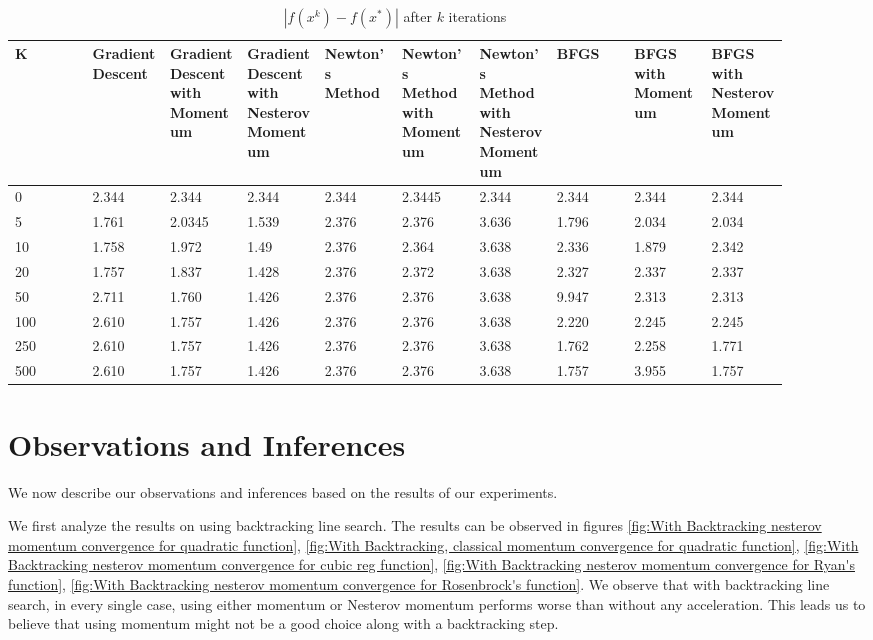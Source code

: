 \documentclass{article}
\begin{document}
\begin{table}[H]
	\centering
	\caption{$ | f(x^k) - f(x^*) | $ after $k$ iterations}
	\label{Levy's function table}
	\begin{tabular}{|l|p{0.1\linewidth}|p{0.1\linewidth}|p{0.1\linewidth}|p{0.1\linewidth}|p{0.1\linewidth}|p{0.1\linewidth}|p{0.1\linewidth}|p{0.1\linewidth}|p{0.1\linewidth}|}
		\hline
		K & Gradient Descent & Gradient Descent with Momentum & Gradient Descent with Nesterov Momentum & Newton's Method & Newton's Method with Momentum & Newton's Method with Nesterov Momentum & BFGS & BFGS with Momentum & BFGS with Nesterov Momentum \\
		\hline
		0 & 2.344 & 2.344 & 2.344 & 2.344 & 2.3445 & 2.344 & 2.344 & 2.344 & 2.344 \\
		\hline
		5 & 1.761 & 2.0345 & 1.539 & 2.376 & 2.376 & 3.636 & 1.796 & 2.034 & 2.034 \\
		\hline
		10 & 1.758 & 1.972 & 1.49 & 2.376 & 2.364 & 3.638 & 2.336 & 1.879 & 2.342 \\
		\hline
		20 & 1.757 & 1.837 & 1.428 & 2.376 & 2.372 & 3.638 & 2.327 & 2.337 & 2.337 \\
		\hline
		50 & 2.711 & 1.760 & 1.426 & 2.376 & 2.376 & 3.638 & 9.947 & 2.313 & 2.313 \\
		\hline
		100 & 2.610 & 1.757 & 1.426 & 2.376& 2.376 & 3.638 & 2.220 & 2.245 & 2.245 \\
		\hline
		250 & 2.610 & 1.757 & 1.426 & 2.376 & 2.376 & 3.638 & 1.762 & 2.258 & 1.771 \\
		\hline
		500 & 2.610 & 1.757 & 1.426 & 2.376 & 2.376 & 3.638 & 1.757 & 3.955 & 1.757 \\
		\hline
	\end{tabular}
\end{table}

\section{Observations and Inferences}\label{inferences}
We now describe our observations and inferences based on the results of our experiments.

We first analyze the results on using backtracking line search. The results can be observed in figures \ref{fig:With Backtracking nesterov momentum convergence for quadratic function}, \ref{fig:With Backtracking, classical momentum convergence for quadratic function},
\ref{fig:With Backtracking nesterov momentum convergence for cubic reg function},
\ref{fig:With Backtracking nesterov momentum convergence for Ryan's function},
\ref{fig:With Backtracking nesterov momentum convergence for Rosenbrock's function}. We observe that with backtracking line search, in every single case, using either momentum or Nesterov momentum performs worse than without any acceleration. This leads us to believe that using momentum might not be a good choice along with a backtracking step.
\end{document}
